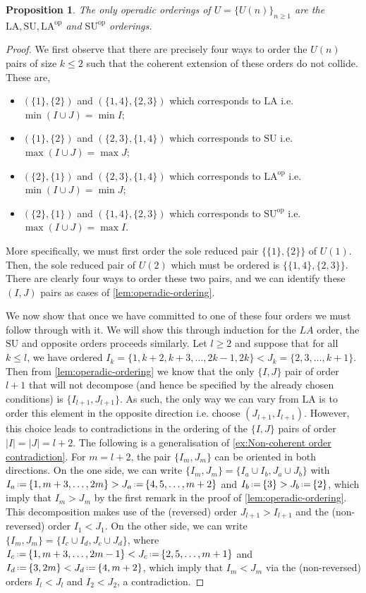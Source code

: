 \documentclass{amsart}
\newtheorem{proposition}[theorem]{Proposition}
\theoremstyle{definition}
\newcommand{\eqdef}{\mbox{\,\raisebox{0.2ex}{\scriptsize\ensuremath{\mathrm:}}\ensuremath{=}\,}} %
\newcommand{\SU}{\mathrm{SU}}
\newcommand{\LA}{\mathrm{LA}}
\newcommand{\op}{\mathrm{op}}
\begin{document}
\begin{proposition}
    \label{prop:operadic-ordering}
The only operadic orderings of $U=\{U(n)\}_{n\geq 1}$ are the $\LA,\SU,\LA^{\op}$ and $\SU^{\op}$ orderings.
\end{proposition}

\begin{proof}
We first observe that there are precisely four ways to order the $U(n)$ pairs of size $k\leq 2$ such that the coherent extension of these orders do not collide.
These are,
\begin{itemize} 
    \item $(\{1\},\{2\})$ and $(\{1,4\},\{2,3\})$ which corresponds to $\LA$ i.e. $\min(I\cup J) = \min I$;
    \item $(\{1\},\{2\})$ and $(\{2,3\},\{1,4\})$ which corresponds to $\SU$ i.e. $\max(I\cup J) = \max J$;
    \item $(\{2\},\{1\})$ and $(\{2,3\},\{1,4\})$ which corresponds to $\LA^{\op}$ i.e. $\min(I\cup J) = \min J$;
    \item $(\{2\},\{1\})$ and $(\{1,4\},\{2,3\})$ which corresponds to $\SU^{\op}$ i.e. $\max(I\cup J) = \max I$.
\end{itemize}
More specifically, we must first order the sole reduced pair $\{\{1\},\{2\}\}$ of $U(1)$.
Then, the sole reduced pair of $U(2)$ which must be ordered is $\{\{1,4\},\{2,3\} \}$.
There are clearly four ways to order these two pairs, and we can identify these $(I,J)$ pairs as cases of \cref{lem:operadic-ordering}.

We now show that once we have committed to one of these four orders we must follow through with it.
We will show this through induction for the $LA$ order, the $\SU$ and opposite orders proceeds similarly.
Let $l\geq 2$ and suppose that for all $k\leq l$, we have ordered $I_k=\{1,k+2,k+3,\dots,2k-1,2k\} < J_k=\{2,3,\dots,k+1\}$.
Then from \cref{lem:operadic-ordering} we know that the only $\{I,J\}$ pair of order $l+1$ that will not decompose (and hence be specified by the already chosen conditions) is $\{I_{l+1},J_{l+1}\}$.
As such, the only way we can vary from $\LA$ is to order this element in the opposite direction i.e. choose $(J_{l+1},I_{l+1})$.
However, this choice leads to contradictions in the ordering of the $\{I,J\}$ pairs of order $|I|=|J|=l+2$.
The following is a generalisation of \cref{ex:Non-coherent order contradiction}.
For $m = l+2$, the pair $\{I_m,J_m\}$ can be oriented in both directions.
On the one side, we can write $\{I_m,J_m\} = \{I_a \cup I_b, J_a \cup J_b\}$ with $I_a \eqdef  \{1,m+3,\dots,2m\} > J_a \eqdef  \{4,5,\dots,m+2\}$  and $I_b \eqdef \{3\} > J_b \eqdef  \{2\}$, which imply that $I_m > J_m$ by the first remark in the proof of \cref{lem:operadic-ordering}. 
This decomposition makes use of the (reversed) order $J_{l+1} > I_{l+1}$ and the (non-reversed) order $I_1 < J_1$.
On the other side, we can write $\{I_m,J_m\} = \{I_c \cup I_d, J_c \cup J_d\}$, where $I_c \eqdef  \{1,m+3,\dots,  2m-1\} < J_c \eqdef  \{2,5,\dots,m+1\}$ and $I_d \eqdef \{3, 2m\} < J_d \eqdef  \{4, m+2\}$, which imply that $I_m < J_m$ via the (non-reversed) orders $I_l < J_l$ and $I_2 < J_2$, a contradiction.
\end{proof}
\end{document}
